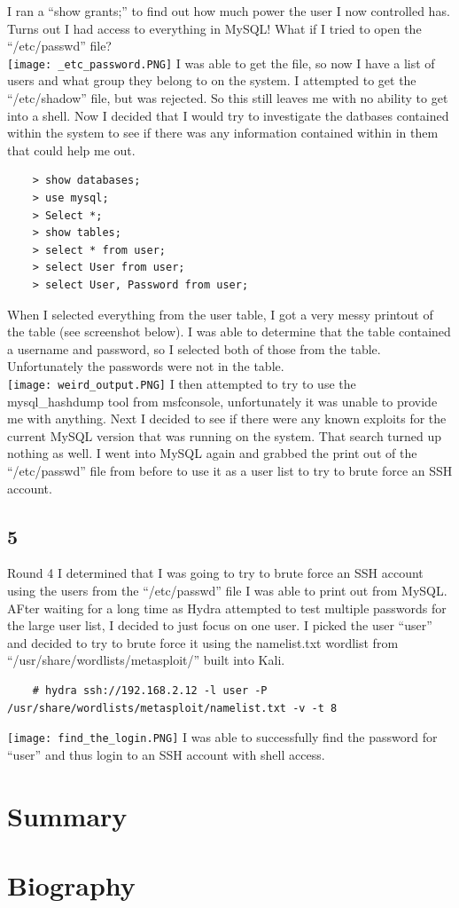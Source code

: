 \documentclass[12pt]{report}
\newcommand{\mychapter}[2]{
    \setcounter{chapter}{#1}
    \setcounter{section}{0}
    \chapter*{#2}
    \addcontentsline{toc}{chapter}{#2}
}
\begin{document}
\newline
I ran a ``show grants;'' to find out how much power the user I now controlled has. Turns out I had access to everything in MySQL! What if I tried to open the ``/etc/passwd'' file?\\
\texttt{[image: \_etc\_password.PNG]}
\newline
I was able to get the file, so now I have a list of users and what group they belong to on the system. I attempted to get the ``/etc/shadow'' file, but was rejected. So this still leaves me with no ability to get into a shell. Now I decided that I would try to investigate the datbases contained within the system to see if there was any information contained within in them that could help me out.
	\begin{verbatim}
	> show databases;
	> use mysql; 
	> Select *;
	> show tables;
	> select * from user;
	> select User from user;
	> select User, Password from user;
	\end{verbatim}
When I selected everything from the user table, I got a very messy printout of the table (see screenshot below). I was able to determine that the table contained a username and password, so I selected both of those from the table. Unfortunately the passwords were not in the table.\\
\texttt{[image: weird\_output.PNG]}
\newline
I then attempted to try to use the mysql\_hashdump tool from msfconsole, unfortunately it was unable to provide me with anything. Next I decided to see if there were any known exploits for the current MySQL version that was running on the system. That search turned up nothing as well. I went into MySQL again and grabbed the print out of the ``/etc/passwd'' file from before to use it as a user list to try to brute force an SSH account.
\newline


\section{5}{Round 4}
I determined that I was going to try to brute force an SSH account using the users from the ``/etc/passwd'' file I was able to print out from MySQL. AFter waiting for a long time as Hydra attempted to test multiple passwords for the large user list, I decided to just focus on one user. I picked the user ``user'' and decided to try to brute force it using the namelist.txt wordlist from ``/usr/share/wordlists/metasploit/'' built into Kali. 
	\begin{verbatim}
	# hydra ssh://192.168.2.12 -l user -P /usr/share/wordlists/metasploit/namelist.txt -v -t 8
	\end{verbatim}
\texttt{[image: find\_the\_login.PNG]}
\newline
I was able to successfully find the password for ``user'' and thus login to an SSH account with shell access.
\clearpage

\mychapter{6}{Summary}

\clearpage

\mychapter{7}{Biography}
\end{document}
